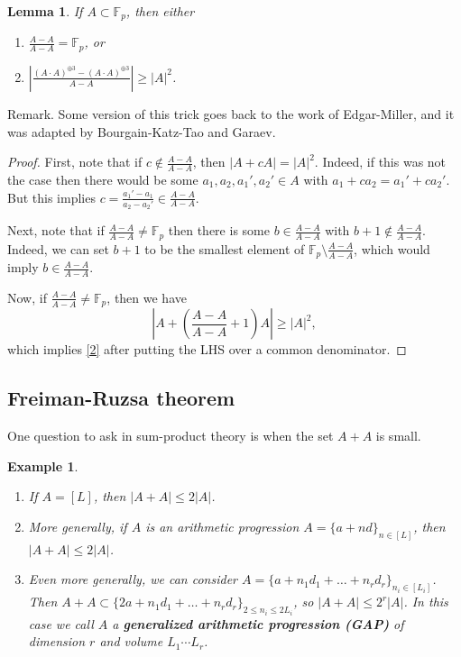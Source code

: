\documentclass[12pt]{amsart}
\newtheorem{lemma}[theorem]{Lemma}
\newtheorem{example}[theorem]{Example}
\newcommand{\F}{\mathbb{F}}
\begin{document}
\begin{lemma}\label{lem:1}
    If $A\subset\F_p$, then either
    \begin{enumerate}
        \item $\frac{A-A}{A-A}=\F_p$, or
        \item $\left|\frac{(A\cdot A)^{\oplus 3}-(A\cdot A)^{\oplus 3}}{A-A}\right|\geq|A|^2$.\label{2}
    \end{enumerate}
\end{lemma}

Remark.  Some version of this trick goes back to the work of Edgar-Miller,  and it was adapted by Bourgain-Katz-Tao and Garaev.

\begin{proof}
    First, note that if $c\not\in\frac{A-A}{A-A}$, then $|A+cA|=|A|^2$. Indeed, if this was not the case then there would be some $a_1,a_2,a_1',a_2'\in A$ with $a_1+ca_2=a_1'+ca_2'$. But this implies $c=\frac{a_1'-a_1}{a_2-a_2'}\in\frac{A-A}{A-A}$.

    Next, note that if $\frac{A-A}{A-A}\neq\F_p$ then there is some $b\in\frac{A-A}{A-A}$ with $b+1\not\in\frac{A-A}{A-A}$. Indeed, we can set $b+1$ to be the smallest element of $\F_p\setminus\frac{A-A}{A-A}$, which would imply $b\in\frac{A-A}{A-A}$.

    Now, if $\frac{A-A}{A-A}\neq\F_p$, then we have
    $$\left|A+\left(\frac{A-A}{A-A}+1\right)A\right|\geq|A|^2,$$
    which implies \ref{2} after putting the LHS over a common denominator.
\end{proof}

\subsection{Freiman-Ruzsa theorem}

One question to ask in sum-product theory is when the set $A+A$ is small.

\begin{example}
    \begin{enumerate}
        \item If $A=[L]$, then $|A+A|\leq 2|A|$.
        \item More generally, if $A$ is an arithmetic progression $A=\{a+nd\}_{n\in[L]}$, then $|A+A|\leq 2|A|$.
        \item Even more generally, we can consider $A=\{a+n_1d_1+\dots+n_rd_r\}_{n_i\in[L_i]}$. Then $A+A\subset\{2a+n_1d_1+\dots+n_rd_r\}_{2\leq n_i\leq 2L_i}$, so $|A+A|\leq 2^r|A|$. In this case we call $A$ a \textbf{generalized arithmetic progression (GAP)} of dimension $r$ and volume $L_1\cdots L_r$.
    \end{enumerate}
\end{example}
\end{document}
